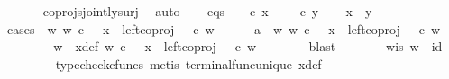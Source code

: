 \begin{isabellebody}
\ \ \ \ \isamarkupfalse%
\ coprojs{\isacharunderscore}{\kern0pt}jointly{\isacharunderscore}{\kern0pt}surj\ \isamarkupfalse%
\ auto\isanewline
\isanewline
\ \ \isamarkupfalse%
\ eqs{\isacharcolon}{\kern0pt}\ {\isachardoublequoteopen}{\isasymlangle}{\isasymt}{\isacharcomma}{\kern0pt}{\isasymf}{\isasymrangle}\ {\isasymamalg}\ {\isasymlangle}{\isasymf}{\isacharcomma}{\kern0pt}{\isasymt}{\isasymrangle}\ {\isasymcirc}\isactrlsub c\ x\ {\isacharequal}{\kern0pt}\ {\isasymlangle}{\isasymt}{\isacharcomma}{\kern0pt}{\isasymf}{\isasymrangle}\ {\isasymamalg}\ {\isasymlangle}{\isasymf}{\isacharcomma}{\kern0pt}{\isasymt}{\isasymrangle}\ {\isasymcirc}\isactrlsub c\ y{\isachardoublequoteclose}\isanewline
\isanewline
\ \ \isamarkupfalse%
\ {\isachardoublequoteopen}x\ {\isacharequal}{\kern0pt}\ y{\isachardoublequoteclose}\isanewline
\ \ \isamarkupfalse%
{\isacharparenleft}{\kern0pt}cases\ {\isachardoublequoteopen}{\isasymexists}\ w{\isachardot}{\kern0pt}\ w\ {\isasymin}\isactrlsub c\ {\isasymone}\ {\isasymand}\ x\ {\isacharequal}{\kern0pt}\ left{\isacharunderscore}{\kern0pt}coproj\ {\isasymone}\ {\isasymone}\ {\isasymcirc}\isactrlsub c\ w{\isachardoublequoteclose}{\isacharparenright}{\kern0pt}\isanewline
\ \ \ \ \isamarkupfalse%
\ a{}{\isacharcolon}{\kern0pt}\ {\isachardoublequoteopen}{\isasymexists}\ w{\isachardot}{\kern0pt}\ w\ {\isasymin}\isactrlsub c\ {\isasymone}\ {\isasymand}\ x\ {\isacharequal}{\kern0pt}\ left{\isacharunderscore}{\kern0pt}coproj\ {\isasymone}\ {\isasymone}\ {\isasymcirc}\isactrlsub c\ w{\isachardoublequoteclose}\isanewline
\ \ \ \ \isamarkupfalse%
\ \isamarkupfalse%
\ w\ \ x{\isacharunderscore}{\kern0pt}def{\isacharcolon}{\kern0pt}\ {\isachardoublequoteopen}w\ {\isasymin}\isactrlsub c\ {\isasymone}\ {\isasymand}\ x\ {\isacharequal}{\kern0pt}\ left{\isacharunderscore}{\kern0pt}coproj\ {\isasymone}\ {\isasymone}\ {\isasymcirc}\isactrlsub c\ w{\isachardoublequoteclose}\isanewline
\ \ \ \ \ \ \isamarkupfalse%
\ blast\isanewline
\ \ \ \ \isamarkupfalse%
\ \isamarkupfalse%
\ w{\isacharunderscore}{\kern0pt}is{\isacharcolon}{\kern0pt}\ {\isachardoublequoteopen}w\ {\isacharequal}{\kern0pt}\ id{\isacharparenleft}{\kern0pt}{\isasymone}{\isacharparenright}{\kern0pt}{\isachardoublequoteclose}\isanewline
\ \ \ \ \ \ \isamarkupfalse%
\ {\isacharparenleft}{\kern0pt}typecheck{\isacharunderscore}{\kern0pt}cfuncs{\isacharcomma}{\kern0pt}\ metis\ terminal{\isacharunderscore}{\kern0pt}func{\isacharunderscore}{\kern0pt}unique\ x{\isacharunderscore}{\kern0pt}def{\isacharparenright}{\kern0pt}\isanewline

\end{isabellebody}
